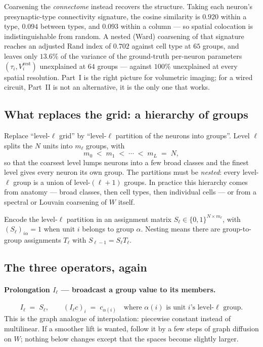 \documentclass[11pt,a4paper]{article}
\begin{document}
Coarsening the \emph{connectome} instead recovers the structure. Taking each neuron's
presynaptic-type connectivity signature, the cosine similarity is $0.920$ within a type,
$0.094$ between types, and $0.093$ within a column --- so spatial colocation is
indistinguishable from random. A nested (Ward) coarsening of that signature reaches an
adjusted Rand index of $0.702$ against cell type at $65$ groups, and leaves only $13.6\%$ of
the variance of the ground-truth per-neuron parameters $(\tau_i, V_i^{\mathrm{rest}})$
unexplained at $64$ groups --- against $100\%$ unexplained at every spatial resolution.
Part~I is the right picture for volumetric imaging; for a wired circuit, Part~II is not an
alternative, it is the only one that works.

\subsection{What replaces the grid: a hierarchy of groups}

Replace ``level-$\ell$ grid'' by ``level-$\ell$ partition of the neurons into groups''.
Level $\ell$ splits the $N$ units into $m_\ell$ groups, with
\begin{equation}
m_0 \;<\; m_1 \;<\; \cdots \;<\; m_L \;=\; N ,
\label{eq:mladder}
\end{equation}
so that the coarsest level lumps neurons into a few broad classes and the finest level
gives every neuron its own group. The partitions must be \emph{nested}: every level-$\ell$
group is a union of level-$(\ell+1)$ groups. In practice this hierarchy comes from
anatomy --- broad classes, then cell types, then individual cells --- or from a spectral or
Louvain coarsening of $W$ itself.

Encode the level-$\ell$ partition in an assignment matrix $S_\ell \in \{0,1\}^{N \times
m_\ell}$, with $(S_\ell)_{i\alpha}=1$ when unit $i$ belongs to group $\alpha$. Nesting
means there are group-to-group assignments $T_\ell$ with $S_{\ell-1} = S_{\ell}T_{\ell}$.

\subsection{The three operators, again}

\paragraph{Prolongation $I_\ell$ --- broadcast a group value to its members.}
\begin{equation}
I_\ell \;=\; S_\ell ,
\qquad
(I_\ell c)_i \;=\; c_{\alpha(i)} \quad\text{where $\alpha(i)$ is unit $i$'s level-$\ell$ group.}
\label{eq:gprolong}
\end{equation}
This is the graph analogue of interpolation: piecewise constant instead of multilinear. If
a smoother lift is wanted, follow it by a few steps of graph diffusion on $W$; nothing below
changes except that the spaces become slightly larger.
\end{document}
